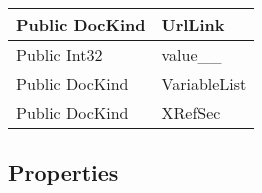 \documentclass[11pt, oneside, a4paper]{book}
\begin{document}
\begin{center}
\begin{tabular}{| p{3cm} | p{12cm} | }
\hline
 Public  DocKind &  UrlLink\hypertarget{SoftwareEngineeringTools.{}Documentation.{}DocKind.{}UrlLink}{}\\
\hline
 Public  Int32 &  value\_\_\hypertarget{SoftwareEngineeringTools.{}Documentation.{}DocKind.{}value\_\_}{}\\
\hline
 Public  DocKind &  VariableList\hypertarget{SoftwareEngineeringTools.{}Documentation.{}DocKind.{}VariableList}{}\\
\hline
 Public  DocKind &  XRefSec\hypertarget{SoftwareEngineeringTools.{}Documentation.{}DocKind.{}XRefSec}{}\\
\hline
\end{tabular}
\end{center}

\subsection{Properties}
\end{document}
